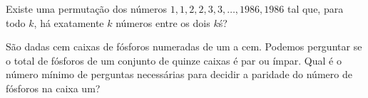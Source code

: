 \begin{questao}
  Existe uma permutação dos números $1,1,2,2,3,3,\ldots,1986,1986$ tal que, para
  todo $k$, há exatamente $k$ números entre os dois $k$\' s?
\end{questao}

\begin{questao}
  São dadas cem caixas de fósforos numeradas de um a cem. Podemos perguntar se o
  total de fósforos de um conjunto de quinze caixas é par ou ímpar. Qual é o
  número mínimo de perguntas necessárias para decidir a paridade do número de
  fósforos na caixa um?
\end{questao}

